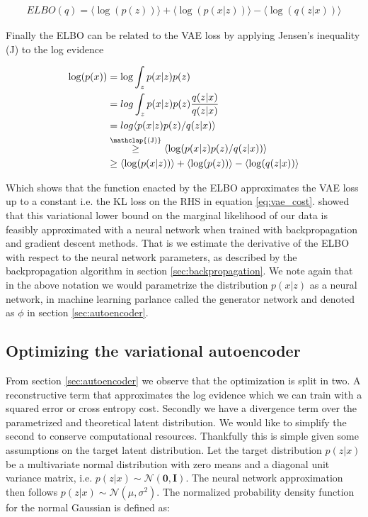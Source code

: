 \begin{align}
ELBO(q) = \langle \log(p(z)) \rangle +  \langle \log(p(x|z)) \rangle - \langle \log(q(z|x)) \rangle
\end{align}

\noindent Finally the ELBO can be related to the VAE loss by applying Jensen's inequality (J) to the log evidence 

\begin{align}
\log (p(x)) &= \log \int_z p(x|z) p(z) \\
&= log \int _z p(x|z) p(z) \frac{q(z|x)}{q(z|x)} \\
& = log \langle p(x|z) p(z)/ q(z|x) \rangle \\
&  \stackrel{\mathclap{\text{(J)}}}{\geq} \langle \log (p(x|z) p(z)/ q(z|x))\rangle \\
& \geq \langle \log(p(x|z))\rangle + \langle \log(p(z))\rangle  - \langle \log(q(z|x))\rangle 
\end{align}

\noindent Which shows that the function enacted by the ELBO approximates the VAE loss up to a constant i.e. the KL loss on the RHS in equation \ref{eq:vae_cost}. \citet{Kingma2013} showed that this variational lower bound on the marginal likelihood of our data is feasibly approximated with a neural network when trained with backpropagation and gradient descent methods. That is we estimate the derivative of the ELBO with respect to the neural network parameters, as described by the backpropagation algorithm in section \ref{sec:backpropagation}. We note again that in the above notation we would parametrize the distribution $p(x|z)$ as a neural network, in machine learning parlance called the generator network and denoted as $\phi$ in section \ref{sec:autoencoder}. 

\subsection{Optimizing the variational autoencoder}

From section \ref{sec:autoencoder} we observe that the optimization is split in two. A reconstructive term that approximates the log evidence which we can train with a squared error or cross entropy cost. Secondly we have a divergence term over the parametrized and theoretical latent distribution. We would like to simplify the second to conserve computational resources. Thankfully this is simple given some assumptions on the target latent distribution. Let the target distribution $p(z | x) $ be a multivariate normal distribution with zero means and a diagonal unit variance matrix, i.e. $p(z | x) \sim  \mathcal{N}(\mathbf{0}, \mathbf{I})$. The neural network approximation then follows $p(z | x) \sim \mathcal{N}(\mu, \sigma^2)$. The normalized probability density function for the normal Gaussian is defined as: 

